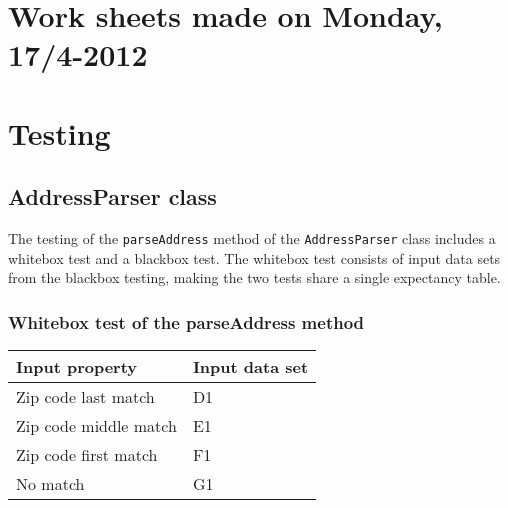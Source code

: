 \documentclass[a4paper,11pt]{article}
\begin{document}
\section{Work sheets made on Monday, 17/4-2012}


\pagebreak

\section{Testing}

\subsection{AddressParser class}
\label{sec:AddressParser test appendix}
The testing of the \texttt{parseAddress} method of the \texttt{AddressParser} class includes a whitebox test and a blackbox test. The whitebox test consists of input data sets from the blackbox testing, making the two tests share a single expectancy table.

\subsubsection{Whitebox test of the parseAddress method}
\begin{tabular}{ p{7cm} | p{4cm}}
	\textbf{Input property} & \textbf{Input data set} \\
	\hline
	Zip code last match & D1 \\
	Zip code middle match & E1 \\
	Zip code first match & F1 \\
	No match & G1
\end{tabular}
\end{document}

